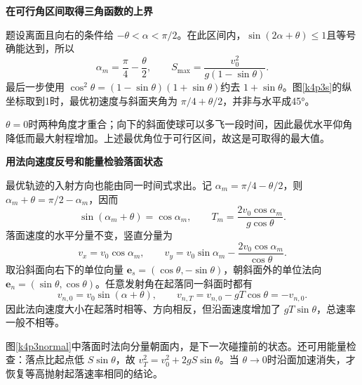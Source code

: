 \begin{solution}
\par\medskip{}\noindent\textbf{在可行角区间取得三角函数的上界}\par\nobreak
题设离面且向右的条件给 $-\theta<\alpha<\pi/2$。在此区间内，$\sin(2\alpha+\theta)\le1$且等号确能达到，所以
\[\boxed{\alpha_m=\frac\pi4-\frac\theta2},\qquad
\boxed{S_{\max}=\frac{v_0^2}{g(1-\sin\theta)}}.
\]
最后一步使用 $\cos^2\theta=(1-\sin\theta)(1+\sin\theta)$约去 $1+\sin\theta$。图\ref{k4p3s}的纵坐标取到1时，最优初速度与斜面夹角为 $\pi/4+\theta/2$，并非与水平成45°。

$\theta=0$时两种角度才重合；向下的斜面使球可以多飞一段时间，因此最优水平仰角降低而最大射程增加。上述最优角位于可行区间，故这是可取得的最大值。



\par\medskip{}\noindent\textbf{用法向速度反号和能量检验落面状态}\par\nobreak
最优轨迹的入射方向也能由同一时间式求出。记 $\alpha_m=\pi/4-\theta/2$，则
$\alpha_m+\theta=\pi/2-\alpha_m$，因而
\[\sin(\alpha_m+\theta)=\cos\alpha_m,\qquad
T_m=\frac{2v_0\cos\alpha_m}{g\cos\theta}.\]
落面速度的水平分量不变，竖直分量为
\[v_x=v_0\cos\alpha_m,\qquad
v_y=v_0\sin\alpha_m-\frac{2v_0\cos\alpha_m}{\cos\theta}.\]
取沿斜面向右下的单位向量 $\bm e_s=(\cos\theta,-\sin\theta)$，朝斜面外的单位法向 $\bm e_n=(\sin\theta,\cos\theta)$。任意发射角在起落同一斜面时都有
\[v_{n,0}=v_0\sin(\alpha+\theta),\qquad
v_{n,T}=v_{n,0}-gT\cos\theta=-v_{n,0}.\]
因此法向速度大小在起落时相等、方向相反，但沿面速度增加了 $gT\sin\theta$，总速率一般不相等。

图\ref{k4p3normal}中落面时法向分量朝面内，是下一次碰撞前的状态。还可用能量检查：落点比起点低 $S\sin\theta$，故 $v_T^2=v_0^2+2gS\sin\theta$。当 $\theta\to0$时沿面加速消失，才恢复等高抛射起落速率相同的结论。
\end{solution}

